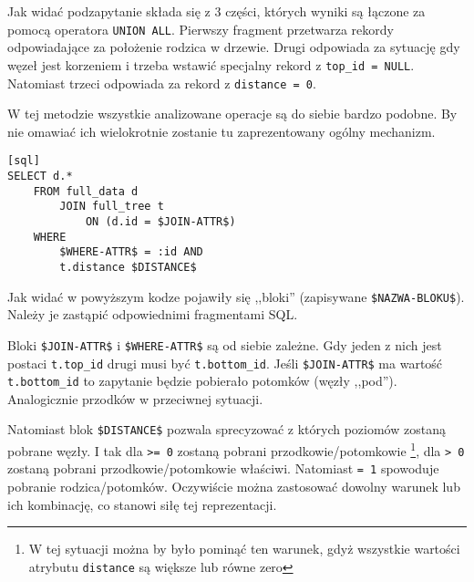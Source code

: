 Jak widać podzapytanie składa się z 3 części, których wyniki są łączone za pomocą operatora \texttt{UNION ALL}.
Pierwszy fragment przetwarza rekordy odpowiadające za położenie rodzica w drzewie.
Drugi odpowiada za sytuację gdy węzeł jest korzeniem i trzeba wstawić specjalny rekord z \texttt{top\_id = NULL}.
Natomiast trzeci odpowiada za rekord z \texttt{distance = 0}.


W tej metodzie wszystkie analizowane operacje są do siebie bardzo podobne.
By nie omawiać ich wielokrotnie zostanie tu zaprezentowany ogólny mechanizm.

\begin{verbatim}[sql]
SELECT d.*
    FROM full_data d 
        JOIN full_tree t 
            ON (d.id = $JOIN-ATTR$)
    WHERE
        $WHERE-ATTR$ = :id AND
        t.distance $DISTANCE$
\end{verbatim}

Jak widać w powyższym kodze pojawiły się ,,bloki'' (zapisywane \verb|$NAZWA-BLOKU$|).
Należy je zastąpić odpowiednimi fragmentami SQL.

Bloki \verb|$JOIN-ATTR$| i \verb|$WHERE-ATTR$| są od siebie zależne.
Gdy jeden z nich jest postaci \verb|t.top_id| drugi musi być \verb|t.bottom_id|.
Jeśli \verb|$JOIN-ATTR$| ma wartość \verb|t.bottom_id| to zapytanie będzie pobierało potomków (węzły ,,pod'').
Analogicznie przodków w przeciwnej sytuacji.

Natomiast blok \verb|$DISTANCE$| pozwala sprecyzować z których poziomów zostaną pobrane węzły.
I tak dla \verb|>= 0| zostaną pobrani przodkowie/potomkowie%
\footnote{W tej sytuacji można by było pominąć ten warunek, gdyż wszystkie wartości atrybutu \texttt{distance} są większe lub równe zero},
dla \verb|> 0| zostaną pobrani przodkowie/potomkowie właściwi.
Natomiast \verb|= 1| spowoduje pobranie rodzica/potomków.
Oczywiście można zastosować dowolny warunek lub ich kombinację, co stanowi siłę tej reprezentacji. 









